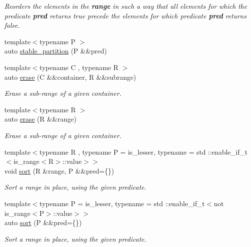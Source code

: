 \begin{DoxyCompactItemize}
\begin{DoxyCompactList}\small\item\em Reorders the elements in the {\bfseries{range}} in such a way that all elements for which the predicate {\bfseries{pred}} returns {\ttfamily true} precede the elements for which predicate {\bfseries{pred}} returns false. \end{DoxyCompactList}\item 
{\footnotesize template$<$typename P $>$ }\\auto \mbox{\hyperlink{namespacerah_ae51c8e542493089f60675db2d0018329}{stable\+\_\+partition}} (P \&\&pred)
\item 
{\footnotesize template$<$typename C , typename R $>$ }\\auto \mbox{\hyperlink{namespacerah_a3b055c0e04f784b9abc89a27ef4534dd}{erase}} (C \&\&container, R \&\&subrange)
\begin{DoxyCompactList}\small\item\em Erase a sub-\/range of a given container. \end{DoxyCompactList}\item 
{\footnotesize template$<$typename R $>$ }\\auto \mbox{\hyperlink{namespacerah_a80ea7a94642c23e9f3db6f6b890f2987}{erase}} (R \&\&range)
\begin{DoxyCompactList}\small\item\em Erase a sub-\/range of a given container. \end{DoxyCompactList}\item 
{\footnotesize template$<$typename R , typename P  = is\+\_\+lesser, typename  = std \+::enable\+\_\+if\+\_\+t$<$is\+\_\+range$<$\+R$>$\+::value$>$$>$ }\\void \mbox{\hyperlink{namespacerah_a02bc4f7618438272f7ec9f3c819d5990}{sort}} (R \&range, P \&\&pred=\{\})
\begin{DoxyCompactList}\small\item\em Sort a range in place, using the given predicate. \end{DoxyCompactList}\item 
{\footnotesize template$<$typename P  = is\+\_\+lesser, typename  = std \+::enable\+\_\+if\+\_\+t$<$not is\+\_\+range$<$\+P$>$\+::value$>$$>$ }\\auto \mbox{\hyperlink{namespacerah_a3a938d529ef4564281a5dca2ce49b538}{sort}} (P \&\&pred=\{\})
\begin{DoxyCompactList}\small\item\em Sort a range in place, using the given predicate. \end{DoxyCompactList}\item 

\end{DoxyCompactItemize}
